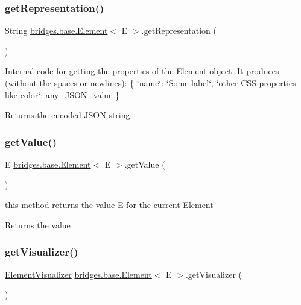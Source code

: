 \subsubsection{\texorpdfstring{get\+Representation()}{getRepresentation()}}
{\footnotesize\ttfamily String \hyperlink{classbridges_1_1base_1_1_element}{bridges.\+base.\+Element}$<$ E $>$.get\+Representation (\begin{DoxyParamCaption}{ }\end{DoxyParamCaption})}

Internal code for getting the properties of the \hyperlink{classbridges_1_1base_1_1_element}{Element} object. It produces (without the spaces or newlines)\+: \{ \char`\"{}name\char`\"{}\+: \char`\"{}\+Some label\char`\"{}, \char`\"{}other C\+S\+S properties like color\char`\"{}\+: any\+\_\+\+J\+S\+O\+N\+\_\+value \} \begin{DoxyReturn}{Returns}
the encoded J\+S\+ON string 
\end{DoxyReturn}
\hypertarget{classbridges_1_1base_1_1_element_a44ddc61db34b6cf0bab7dfba667d54af}{}\label{classbridges_1_1base_1_1_element_a44ddc61db34b6cf0bab7dfba667d54af} 
\subsubsection{\texorpdfstring{get\+Value()}{getValue()}}
{\footnotesize\ttfamily E \hyperlink{classbridges_1_1base_1_1_element}{bridges.\+base.\+Element}$<$ E $>$.get\+Value (\begin{DoxyParamCaption}{ }\end{DoxyParamCaption})}

this method returns the value E for the current \hyperlink{classbridges_1_1base_1_1_element}{Element} \begin{DoxyReturn}{Returns}
the value 
\end{DoxyReturn}
\hypertarget{classbridges_1_1base_1_1_element_a42c84d41dfb7bd05a586e303cb33de72}{}\label{classbridges_1_1base_1_1_element_a42c84d41dfb7bd05a586e303cb33de72} 
\subsubsection{\texorpdfstring{get\+Visualizer()}{getVisualizer()}}
{\footnotesize\ttfamily \hyperlink{classbridges_1_1base_1_1_element_visualizer}{Element\+Visualizer} \hyperlink{classbridges_1_1base_1_1_element}{bridges.\+base.\+Element}$<$ E $>$.get\+Visualizer (\begin{DoxyParamCaption}{ }\end{DoxyParamCaption})}

